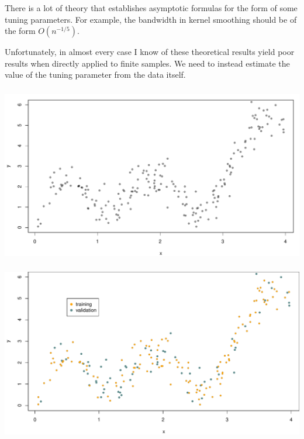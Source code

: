 \documentclass[xetex,mathserif,serif,aspectratio=169]{beamer}
\begin{document}
\begin{frame}[fragile] \frametitle{} \oldB \small


There is a lot of theory that establishes asymptotic formulas for the form
of some tuning parameters. For example, the bandwidth in kernel smoothing
should be of the form $O(n^{-1/5})$.

\pause Unfortunately, in almost every case I know of these theoretical results yield
poor results when directly applied to finite samples. We need to instead
estimate the value of the tuning parameter from the data itself.

\end{frame}

\begin{frame}[fragile] \frametitle{} \oldB \small

\begin{center}
\includegraphics[width=\textwidth]{img/valid1.pdf}
\end{center}

\end{frame}

\begin{frame}[fragile] \frametitle{} \oldB \small

\begin{center}
\includegraphics[width=\textwidth]{img/valid2.pdf}
\end{center}

\end{frame}
\end{document}
